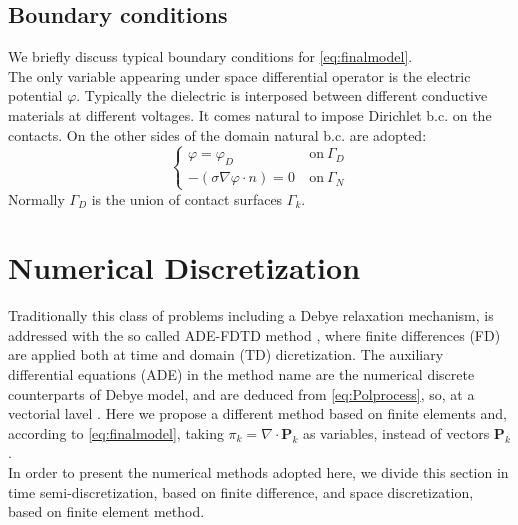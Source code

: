 \documentclass[11pt,a4paper]{article}
\begin{document}
\subsection{Boundary conditions}
We briefly discuss typical boundary conditions for \eqref{eq:finalmodel}.\\
The only variable appearing under space differential operator is the electric potential \(\varphi\). Typically the dielectric is interposed between different conductive materials at different voltages. It comes natural to impose Dirichlet b.c. on the contacts. On the other sides of the domain natural b.c. are adopted:
\begin{equation}\label{eq:LEVEL1Bc}
	\left\{\begin{aligned}
		\left.\varphi\right. = \varphi_D\ &\ \mathrm{on}\ \Gamma_D\\[3mm]
		-\left.\left(\sigma \nabla  \varphi \cdot n\right) = 0\right. &\ \mathrm{on}\ \Gamma_N
	\end{aligned}\right.
\end{equation}
Normally \(\Gamma_D\) is the union of contact surfaces \(\Gamma_k\).

\section{Numerical Discretization}
Traditionally this class of problems including a Debye relaxation mechanism, is addressed with the so called ADE-FDTD method \cite{taflove}, where finite differences (FD) are applied both at time and domain (TD) dicretization. The auxiliary differential equations (ADE) in the method name are the numerical discrete counterparts of Debye model, and are deduced from \eqref{eq:Polprocess}, so, at a vectorial lavel \cite{taflove}. Here we propose a different method based on finite elements and, according to \eqref{eq:finalmodel}, taking \(\pi_k = \nabla \cdot \mathbf{P}_k\) as variables, instead of vectors \(\mathbf{P}_k\).\\
In order to present the numerical methods adopted here, we divide this section in time semi-discretization, based on finite difference, and space discretization, based on finite element method. 
\end{document}
